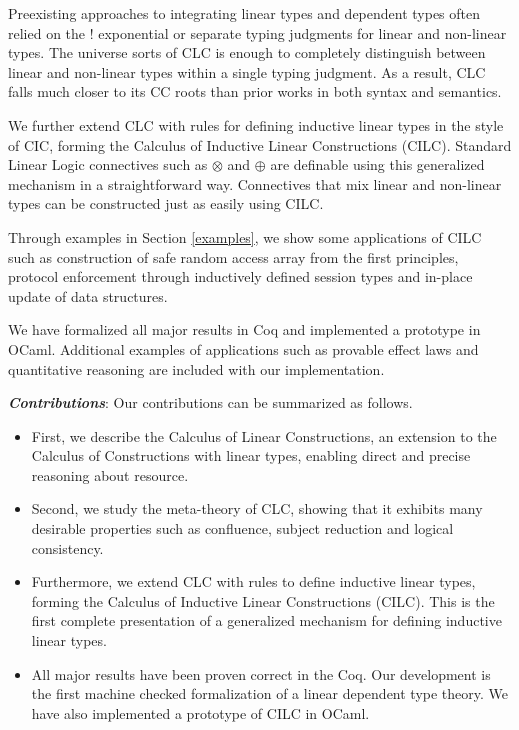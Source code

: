\documentclass[sigplan,screen,review,anonymous]{acmart}
\begin{document}
Preexisting approaches to integrating linear types and dependent types often relied on the ! exponential or separate typing judgments for linear and non-linear types. The universe sorts of CLC is enough to completely distinguish between linear and non-linear types within a single typing judgment. As a result, CLC falls much closer to its CC roots than prior works in both syntax and semantics.

We further extend CLC with rules for defining inductive linear types in the style of CIC, forming the Calculus of Inductive Linear Constructions (CILC). Standard Linear Logic connectives such as $\otimes$ and $\oplus$ are definable using this generalized mechanism in a straightforward way. Connectives that mix linear and non-linear types can be constructed just as easily using CILC.

Through examples in Section \ref{examples}, we show some applications of CILC such as construction of safe random access array from the first principles, protocol enforcement through inductively defined session types and in-place update of data structures.

We have formalized all major results in Coq and implemented a prototype in OCaml. Additional examples of applications such as provable effect laws and quantitative reasoning are included with our implementation.

\vspace{4pt}
\noindent \textbf{\textit{Contributions}}:
Our contributions can be summarized as follows.
\begin{itemize}
  \item First, we describe the Calculus of Linear Constructions, an extension to the Calculus of Constructions with linear types, enabling direct and precise reasoning about resource.
  \item Second, we study the meta-theory of CLC, showing that it exhibits many desirable properties such as confluence, subject reduction and logical consistency.
  \item Furthermore, we extend CLC with rules to define inductive linear types, forming the Calculus of Inductive Linear Constructions (CILC). This is the first complete presentation of a generalized mechanism for defining inductive linear types.
  \item All major results have been proven correct in the Coq. Our development is the first machine checked formalization of a linear dependent type theory. We have also implemented a prototype of CILC in OCaml.
\end{itemize}
\end{document}
